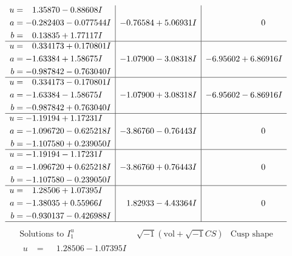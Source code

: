 \documentclass[1p]{elsarticle_modified}
\theoremstyle{definition}
\newcommand{\I}{\sqrt{-1}}
\begin{document}
$$\begin{array}{c|c|c}
\begin{aligned}
u &= \phantom{-}1.35870 - 0.88608 I \\
a &= -0.282403 - 0.077544 I \\
b &= \phantom{-}0.13835 + 1.77117 I\end{aligned}
 & -0.76584 + 5.06931 I & \phantom{-0.000000 } 0 \\ \hline\begin{aligned}
u &= \phantom{-}0.334173 + 0.170801 I \\
a &= -1.63384 + 1.58675 I \\
b &= -0.987842 - 0.763040 I\end{aligned}
 & -1.07900 - 3.08318 I & -6.95602 + 6.86916 I \\ \hline\begin{aligned}
u &= \phantom{-}0.334173 - 0.170801 I \\
a &= -1.63384 - 1.58675 I \\
b &= -0.987842 + 0.763040 I\end{aligned}
 & -1.07900 + 3.08318 I & -6.95602 - 6.86916 I \\ \hline\begin{aligned}
u &= -1.19194 + 1.17231 I \\
a &= -1.096720 - 0.625218 I \\
b &= -1.107580 + 0.239050 I\end{aligned}
 & -3.86760 - 0.76443 I & \phantom{-0.000000 } 0 \\ \hline\begin{aligned}
u &= -1.19194 - 1.17231 I \\
a &= -1.096720 + 0.625218 I \\
b &= -1.107580 - 0.239050 I\end{aligned}
 & -3.86760 + 0.76443 I & \phantom{-0.000000 } 0 \\ \hline\begin{aligned}
u &= \phantom{-}1.28506 + 1.07395 I \\
a &= -1.38035 + 0.55966 I \\
b &= -0.930137 - 0.426988 I\end{aligned}
 & \phantom{-}1.82933 - 4.43364 I & \phantom{-0.000000 } 0\\
 \hline 
 \end{array}$$\newpage$$\begin{array}{c|c|c}  
\text{Solutions to }I^u_{1}& \I (\text{vol} + \sqrt{-1}CS) & \text{Cusp shape}\\
 \hline 
\begin{aligned}
u &= \phantom{-}1.28506 - 1.07395 I \\

\end{aligned}
\end{array}$$
\end{document}
